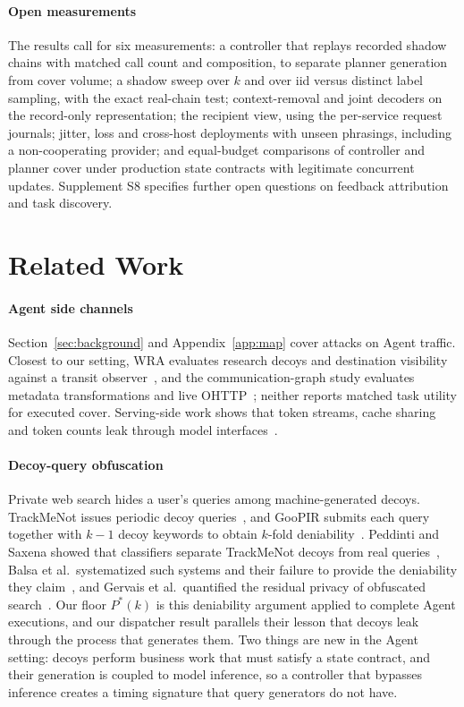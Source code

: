 \paragraph{Open measurements}
The results call for six measurements: a controller that replays recorded shadow chains with matched call count and composition, to separate planner generation from cover volume; a shadow sweep over $k$ and over iid versus distinct label sampling, with the exact real-chain test; context-removal and joint decoders on the record-only representation; the recipient view, using the per-service request journals; jitter, loss and cross-host deployments with unseen phrasings, including a non-cooperating provider; and equal-budget comparisons of controller and planner cover under production state contracts with legitimate concurrent updates. Supplement S8 specifies further open questions on feedback attribution and task discovery.

\section{Related Work}\label{sec:related}
\paragraph{Agent side channels}
Section~\ref{sec:background} and Appendix~\ref{app:map} cover attacks on Agent traffic. Closest to our setting, WRA evaluates research decoys and destination visibility against a transit observer~\cite{jeong2026wra}, and the communication-graph study evaluates metadata transformations and live OHTTP~\cite{dangol2026workflow}; neither reports matched task utility for executed cover. Serving-side work shows that token streams, cache sharing and token counts leak through model interfaces~\cite{weiss2024prompt,whisperleak2025,earlybird2025,timewilltell2024,carlini2024timing,wu2026cacheprune}.

\paragraph{Decoy-query obfuscation}
Private web search hides a user's queries among machine-generated decoys. TrackMeNot issues periodic decoy queries~\cite{howe2008trackmenot}, and GooPIR submits each query together with $k-1$ decoy keywords to obtain $k$-fold deniability~\cite{domingoferrer2009goopir}. Peddinti and Saxena showed that classifiers separate TrackMeNot decoys from real queries~\cite{peddinti2010trackmenot}, Balsa et al.\ systematized such systems and their failure to provide the deniability they claim~\cite{balsa2012obpws}, and Gervais et al.\ quantified the residual privacy of obfuscated search~\cite{gervais2014websearch}. Our floor $P^*(k)$ is this deniability argument applied to complete Agent executions, and our dispatcher result parallels their lesson that decoys leak through the process that generates them. Two things are new in the Agent setting: decoys perform business work that must satisfy a state contract, and their generation is coupled to model inference, so a controller that bypasses inference creates a timing signature that query generators do not have.

